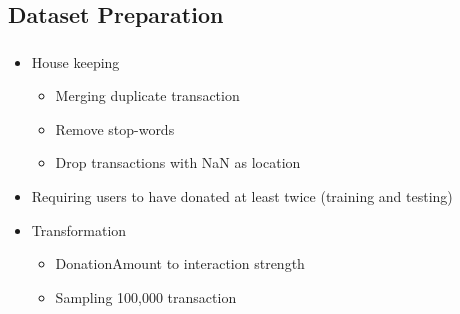 \documentclass[aspectratio=169]{beamer}
\begin{document}
\subsection{Dataset Preparation}
\begin{frame}
	\frametitle{\insertsection}
	\framesubtitle{\insertsubsection}

	\begin{itemize}
		\item House keeping
		\begin{itemize}
			\item Merging duplicate transaction
			\item Remove stop-words
			\item Drop transactions with NaN as location
		\end{itemize}
		\item Requiring users to have donated at least twice (training and testing)
		\item Transformation
		\begin{itemize}
			\item DonationAmount to interaction strength
			\item Sampling 100,000 transaction
		\end{itemize}
	\end{itemize}

\end{frame}
\end{document}
